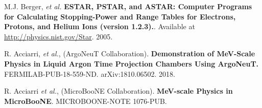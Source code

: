   M.J. Berger, \textit{et al.} \textbf{ESTAR, PSTAR, and ASTAR: Computer Programs for Calculating Stopping-Power and Range Tables for Electrons, Protons, and Helium Ions (version 1.2.3).}. Available at \href{http://physics.nist.gov/Star}{http://physics.nist.gov/Star}. 2005.

 R. Acciarri, \textit{et al.}, (ArgoNeuT Collaboration). \textbf{Demonstration of MeV-Scale Physics in
Liquid Argon Time Projection Chambers Using ArgoNeuT.} FERMILAB-PUB-18-559-ND. arXiv:1810.06502. 2018.

 R. Acciarri \textit{et al.}, (MicroBooNE Collaboration). \textbf{MeV-scale Physics in MicroBooNE}. MICROBOONE-NOTE 1076-PUB. 